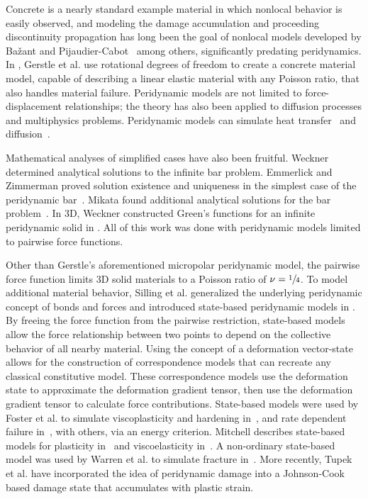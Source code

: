 Concrete is a nearly standard example material in which nonlocal behavior is easily observed, and modeling the damage accumulation and proceeding discontinuity propagation has long been the goal of nonlocal models developed by Ba\v{z}ant and Pijaudier-Cabot~\cite{bazant1988nonlocal} among others, significantly predating peridynamics.
In \cite{gerstle2007peridynamic}, Gerstle et al. use rotational degrees of freedom to create a concrete material model, capable of describing a linear elastic material with any Poisson ratio, that also handles material failure.
Peridynamic models are not limited to force-displacement relationships; the theory has also been applied to diffusion processes and multiphysics problems.
Peridynamic models can simulate heat transfer~\cite{bobaru2010peridynamic} and diffusion~\cite{burch2011classical}.

Mathematical analyses of simplified cases have also been fruitful.
Weckner~\cite{weckner2005effect} determined analytical solutions to the infinite bar problem. 
Emmerlick and Zimmerman proved solution existence and uniqueness in the simplest case of the peridynamic bar~\cite{emmrich2007analysis}.
Mikata found additional analytical solutions for the bar problem~\cite{mikata2012analytical}.
In 3D, Weckner constructed Green's functions for an infinite peridynamic solid in \cite{weckner2009green}.
All of this work was done with peridynamic models limited to pairwise force functions.

Other than Gerstle's aforementioned micropolar peridynamic model, the pairwise force function limits 3D solid materials to a Poisson ratio of  \(\nu=\sfrac{1}{4}\). 
To model additional material behavior, Silling et al. generalized the underlying peridynamic concept of bonds and forces and introduced state-based peridynamic models in \cite{silling2007peridynamic}.
By freeing the force function from the pairwise restriction, state-based models allow the force relationship between two points to depend on the collective behavior of all nearby material.
Using the concept of a deformation vector-state allows for the construction of correspondence models that can recreate any classical constitutive model.
These correspondence models use the deformation state to approximate the deformation gradient tensor, then use the deformation gradient tensor to calculate force contributions.
State-based models were used by Foster et al. to simulate viscoplasticity and hardening in~\cite{foster2010viscoplasticity}, and rate dependent failure in~\cite{foster2011energy}, with others, via an energy criterion.
Mitchell describes state-based models for plasticity in~\cite{mitchell2011nonlocal} and viscoelasticity in~\cite{mitchell2011non}.
A non-ordinary state-based model was used by Warren et al. to simulate fracture in~\cite{warren2009non}.
More recently, Tupek et al. have incorporated the idea of peridynamic damage into a Johnson-Cook based damage state that accumulates with plastic strain\cite{tupek2013approach}.
%
